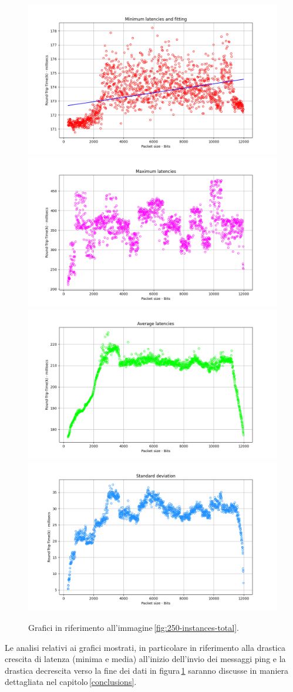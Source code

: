 \begin{figure}[h]
    \centering
    \includegraphics[width = .49\textwidth]{hw-2/report/imgs/250-instances/la-min-latencies.png}
    \includegraphics[width = .49\textwidth]{hw-2/report/imgs/250-instances/la-max-latencies.png}
    \includegraphics[width = .49\textwidth]{hw-2/report/imgs/250-instances/la-avg-latencies.png}
    \includegraphics[width = .49\textwidth]{hw-2/report/imgs/250-instances/la-standard-deviation.png}
    \caption{Grafici in riferimento all'immagine\,\ref{fig:250-instances-total}.}
    \label{fig:250-instances-stats}
\end{figure}

\FloatBarrier\noindent Le analisi relativi ai grafici mostrati, in particolare in riferimento alla drastica crescita di latenza (minima e media) all'inizio dell'invio dei messaggi ping e la drastica decrescita verso la fine dei dati in figura\,\ref{fig:250-instances-stats} saranno discusse in maniera dettagliata nel capitolo\,\ref{conclusions}.

